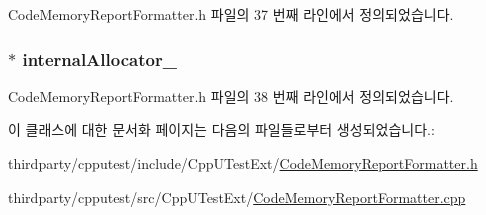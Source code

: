 Code\+Memory\+Report\+Formatter.\+h 파일의 37 번째 라인에서 정의되었습니다.

\subsubsection[{\texorpdfstring{internal\+Allocator\+\_\+}{internalAllocator_}}]{$\ast$ internal\+Allocator\+\_\+\hspace{0.3cm}{\ttfamily [private]}}\hypertarget{class_code_memory_report_formatter_a5177d1223b6c18bfc2ddfb40e8400d84}{}\label{class_code_memory_report_formatter_a5177d1223b6c18bfc2ddfb40e8400d84}


Code\+Memory\+Report\+Formatter.\+h 파일의 38 번째 라인에서 정의되었습니다.



이 클래스에 대한 문서화 페이지는 다음의 파일들로부터 생성되었습니다.\+:\begin{DoxyCompactItemize}
\item 
thirdparty/cpputest/include/\+Cpp\+U\+Test\+Ext/\hyperlink{_code_memory_report_formatter_8h}{Code\+Memory\+Report\+Formatter.\+h}\item 
thirdparty/cpputest/src/\+Cpp\+U\+Test\+Ext/\hyperlink{_code_memory_report_formatter_8cpp}{Code\+Memory\+Report\+Formatter.\+cpp}\end{DoxyCompactItemize}

